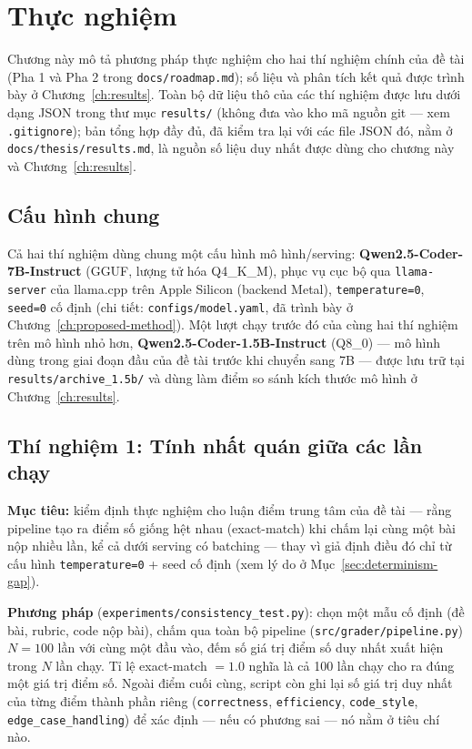 \documentclass[a4paper,12pt]{report}
\begin{document}
\chapter{Thực nghiệm}
\label{ch:experiments}

Chương này mô tả phương pháp thực nghiệm cho hai thí nghiệm chính của đề
tài (Pha 1 và Pha 2 trong \texttt{docs/roadmap.md}); số liệu và phân tích
kết quả được trình bày ở Chương~\ref{ch:results}. Toàn bộ dữ liệu thô của
các thí nghiệm được lưu dưới dạng JSON trong thư mục \texttt{results/}
(không đưa vào kho mã nguồn git — xem \texttt{.gitignore}); bản tổng hợp
đầy đủ, đã kiểm tra lại với các file JSON đó, nằm ở
\texttt{docs/thesis/results.md}, là nguồn số liệu duy nhất được dùng cho
chương này và Chương~\ref{ch:results}.

\section{Cấu hình chung}

Cả hai thí nghiệm dùng chung một cấu hình mô hình/serving:
\textbf{Qwen2.5-Coder-7B-Instruct} (GGUF, lượng tử hóa Q4\_K\_M), phục vụ
cục bộ qua \texttt{llama-server} của llama.cpp trên Apple Silicon (backend
Metal), \texttt{temperature=0}, \texttt{seed=0} cố định (chi tiết:
\texttt{configs/model.yaml}, đã trình bày ở
Chương~\ref{ch:proposed-method}). Một lượt chạy trước đó của cùng hai thí
nghiệm trên mô hình nhỏ hơn, \textbf{Qwen2.5-Coder-1.5B-Instruct} (Q8\_0) —
mô hình dùng trong giai đoạn đầu của đề tài trước khi chuyển sang 7B — được
lưu trữ tại \texttt{results/archive\_1.5b/} và dùng làm điểm so sánh kích
thước mô hình ở Chương~\ref{ch:results}.

\section{Thí nghiệm 1: Tính nhất quán giữa các lần chạy}
\label{sec:exp-consistency}

\textbf{Mục tiêu:} kiểm định thực nghiệm cho luận điểm trung tâm của đề
tài — rằng pipeline tạo ra điểm số giống hệt nhau (exact-match) khi chấm
lại cùng một bài nộp nhiều lần, kể cả dưới serving có batching — thay vì
giả định điều đó chỉ từ cấu hình \texttt{temperature=0} + seed cố định
(xem lý do ở Mục~\ref{sec:determinism-gap}).

\textbf{Phương pháp} (\texttt{experiments/consistency\_test.py}): chọn một
mẫu cố định (đề bài, rubric, code nộp bài), chấm qua toàn bộ pipeline
(\texttt{src/grader/pipeline.py}) $N=100$ lần với cùng một đầu vào, đếm số
giá trị điểm số duy nhất xuất hiện trong $N$ lần chạy. Tỉ lệ exact-match
$=1.0$ nghĩa là cả 100 lần chạy cho ra đúng một giá trị điểm số. Ngoài điểm
cuối cùng, script còn ghi lại số giá trị duy nhất của từng điểm thành phần
riêng (\texttt{correctness}, \texttt{efficiency}, \texttt{code\_style},
\texttt{edge\_case\_handling}) để xác định — nếu có phương sai — nó nằm ở
tiêu chí nào.
\end{document}
